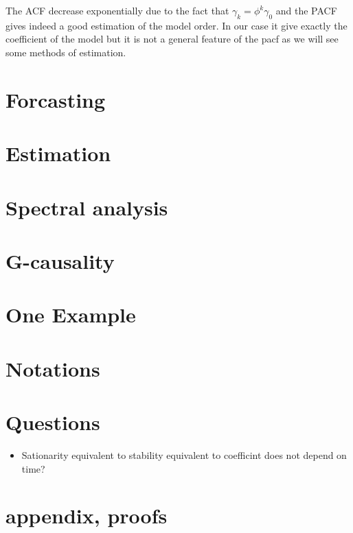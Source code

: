 \documentclass{article}
\begin{document}
The ACF decrease exponentially due to the fact that $\gamma_k=\phi^k\gamma_0$ and the PACF gives indeed a good estimation of the model order. In our case it give exactly the coefficient of the model but it is not a general feature of the pacf as we will see some methods of estimation.
\section{Forcasting}
\section{Estimation}
\section{Spectral analysis}
\section{G-causality}
\section{One Example}
\section{Notations}
\section{Questions}
\begin{itemize}
\item Sationarity equivalent to stability equivalent to coefficint does not depend on time?
\end{itemize}
\section{appendix, proofs}
\end{document}
